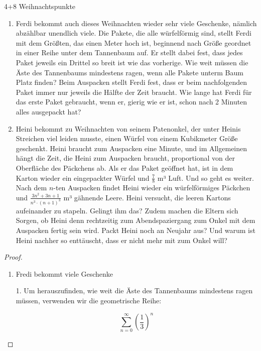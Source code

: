 \documentclass{problemset}
\begin{document}
\begin{problem}[Weihnachtsaufgaben*]{4+8 Weihnachtspunkte}
\begin{enumerate}
	\item Ferdi bekommt auch dieses Weihnachten wieder sehr viele Geschenke, nämlich
	      abzählbar unendlich viele. Die Pakete, die alle würfelförmig sind, stellt Ferdi
	      mit dem Größten, das einen Meter hoch ist, beginnend nach Größe geordnet in
	      einer Reihe unter dem Tannenbaum auf. Er stellt dabei fest, dass jedes Paket
	      jeweils ein Drittel so breit ist wie das vorherige. Wie weit müssen die Äste
	      des Tannenbaums mindestens ragen, wenn alle Pakete unterm Baum Platz finden?
	      Beim Auspacken stellt Ferdi fest, dass er beim nachfolgenden Paket immer nur
	      jeweils die Hälfte der Zeit braucht. Wie lange hat Ferdi für das erste Paket
	      gebraucht, wenn er, gierig wie er ist, schon nach 2 Minuten alles ausgepackt
	      hat?
	\item Heini bekommt zu Weihnachten von seinem Patenonkel, der unter Heinis Streichen
	      viel leiden musste, einen Würfel von einem Kubikmeter Größe geschenkt. Heini
	      braucht zum Auspacken eine Minute, und im Allgemeinen hängt die Zeit, die Heini
	      zum Auspacken braucht, proportional von der Oberfläche des Päckchens ab. Als er
	      das Paket geöffnet hat, ist in dem Karton wieder ein eingepackter Würfel und
	      $\frac{7}{8}$ m³ Luft. Und so geht es weiter. Nach dem $n$-ten Auspacken findet
	      Heini wieder ein würfelförmiges Päckchen und
	      $\frac{3n^2+3n+1}{n^3\cdot(n+1)^3}$ m³ gähnende Leere. Heini versucht, die
	      leeren Kartons aufeinander zu stapeln. Gelingt ihm das? Zudem machen die Eltern
	      sich Sorgen, ob Heini denn rechtzeitig zum Abendspaziergang zum Onkel mit dem
	      Auspacken fertig sein wird. Packt Heini noch an Neujahr aus? Und warum ist
	      Heini nachher so enttäuscht, dass er nicht mehr mit zum Onkel will?
\end{enumerate}

\begin{proof}
	$ $

	\begin{enumerate}
		\item Fredi bekommt viele Geschenke

		      1. Um herauszufinden, wie weit die Äste des Tannenbaums mindestens ragen müssen, verwenden wir die geometrische Reihe:

		      \[
			      \sum_{n=0}^{\infty} {\left(\frac{1}{3}\right)}^n
		      \]


\end{enumerate}
\end{proof}
\end{problem}
\end{document}
